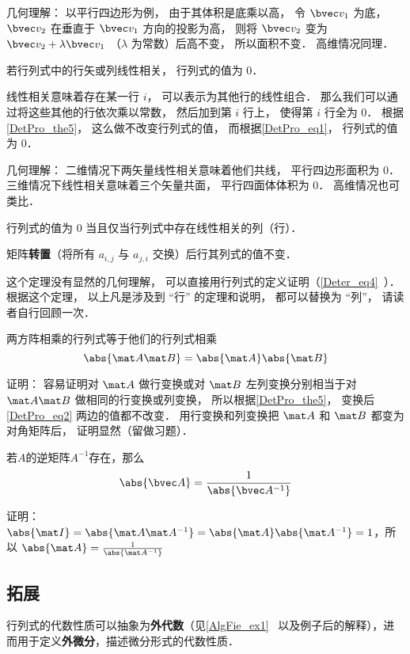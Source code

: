 几何理解： 以平行四边形为例， 由于其体积是底乘以高， 令 $\bvec v_1$ 为底， $\bvec v_2$ 在垂直于 $\bvec v_1$ 方向的投影为高， 则将 $\bvec v_2$ 变为 $\bvec v_2 + \lambda \bvec v_1$ （$\lambda$ 为常数）后高不变， 所以面积不变． 高维情况同理．

\begin{theorem}{ }
若行列式中的行矢或列线性相关， 行列式的值为 0．
\end{theorem}
线性相关意味着存在某一行 $i$， 可以表示为其他行的线性组合． 那么我们可以通过将这些其他的行依次乘以常数， 然后加到第 $i$ 行上， 使得第 $i$ 行全为 0． 根据\autoref{DetPro_the5}， 这么做不改变行列式的值， 而根据\autoref{DetPro_eq1}， 行列式的值为 0．

几何理解： 二维情况下两矢量线性相关意味着他们共线， 平行四边形面积为 0． 三维情况下线性相关意味着三个矢量共面， 平行四面体体积为 0． 高维情况也可类比．

\begin{theorem}{ } \label{DetPro_the2}
行列式的值为 0 当且仅当行列式中存在线性相关的列（行）．
\end{theorem}

\begin{theorem}{ }\label{DetPro_the7}
矩阵\textbf{转置}（将所有 $a_{i,j}$ 与 $a_{j,i}$ 交换）后行其列式的值不变．
\end{theorem}
这个定理没有显然的几何理解， 可以直接用行列式的定义证明（\autoref{Deter_eq4}~）． 根据这个定理， 以上凡是涉及到 “行” 的定理和说明， 都可以替换为 “列”， 请读者自行回顾一次．

\begin{theorem}{}\label{DetPro_the8}
两方阵相乘的行列式等于他们的行列式相乘
\begin{equation}\label{DetPro_eq2}
\abs{\mat A \mat B} = \abs{\mat A}\abs{\mat B}
\end{equation}
\end{theorem}
证明： 容易证明对 $\mat A$ 做行变换或对 $\mat B$ 左列变换分别相当于对 $\mat A\mat B$ 做相同的行变换或列变换， 所以根据\autoref{DetPro_the5}， 变换后\autoref{DetPro_eq2} 两边的值都不改变． 用行变换和列变换把 $\mat A$ 和 $\mat B$ 都变为对角矩阵后， 证明显然（留做习题）．

\begin{theorem}{}
若$A$的逆矩阵$A^{-1}$存在，那么
\begin{equation}
\abs{\bvec A}=\frac{1}{\abs{\bvec A^{-1}}}
\end{equation}
\end{theorem}
证明：
$\abs{\mat I} = \abs{\mat A \mat A^{-1}} = \abs{\mat A}\abs{\mat A^{-1}}=1$，所以
$\abs{\mat A}=\frac{1}{\abs{\mat A^{-1}}}$

\subsection{拓展}

行列式的代数性质可以抽象为\textbf{外代数}（见\autoref{AlgFie_ex1}~ 以及例子后的解释），进而用于定义\textbf{外微分}，描述微分形式的代数性质．
